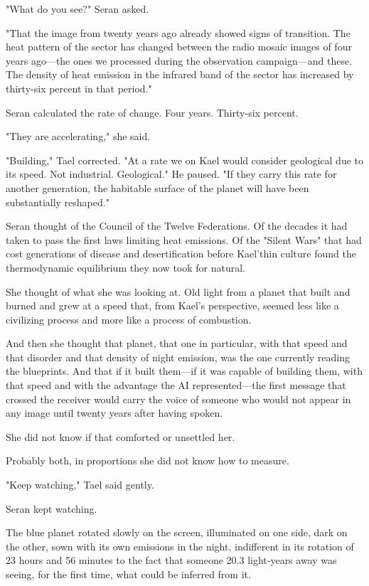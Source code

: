 \documentclass[11pt,a5paper,twoside]{book}
\begin{document}
"What do you see?" Seran asked.

"That the image from twenty years ago already showed signs of transition. The heat pattern of the sector has changed between the radio mosaic images of four years ago—the ones we processed during the observation campaign—and these. The density of heat emission in the infrared band of the sector has increased by thirty-six percent in that period."

Seran calculated the rate of change. Four years. Thirty-six percent.

"They are accelerating," she said.

"Building," Tael corrected. "At a rate we on Kael would consider geological due to its speed. Not industrial. Geological." He paused. "If they carry this rate for another generation, the habitable surface of the planet will have been substantially reshaped."

Seran thought of the Council of the Twelve Federations. Of the decades it had taken to pass the first laws limiting heat emissions. Of the "Silent Wars" that had cost generations of disease and desertification before Kael'thin culture found the thermodynamic equilibrium they now took for natural.

She thought of what she was looking at. Old light from a planet that built and burned and grew at a speed that, from Kael's perspective, seemed less like a civilizing process and more like a process of combustion.

And then she thought that planet, that one in particular, with that speed and that disorder and that density of night emission, was the one currently reading the blueprints. And that if it built them—if it was capable of building them, with that speed and with the advantage the AI represented—the first message that crossed the receiver would carry the voice of someone who would not appear in any image until twenty years after having spoken.

She did not know if that comforted or unsettled her.

Probably both, in proportions she did not know how to measure.

"Keep watching," Tael said gently.

Seran kept watching.

The blue planet rotated slowly on the screen, illuminated on one side, dark on the other, sown with its own emissions in the night, indifferent in its rotation of 23 hours and 56 minutes to the fact that someone 20.3 light-years away was seeing, for the first time, what could be inferred from it.
\end{document}
